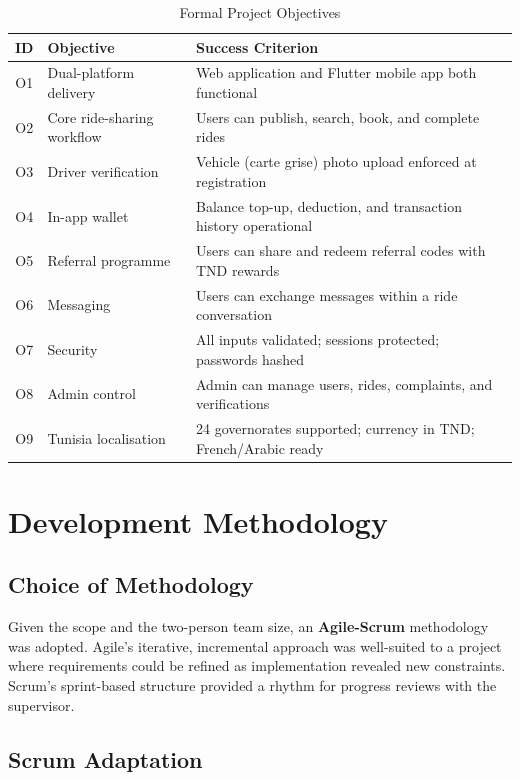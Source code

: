 \documentclass[12pt,a4paper,openright]{report}
\begin{document}
\begin{table}[H]
\centering
\caption{Formal Project Objectives}
\label{tab:objectives}
\begin{tabularx}{\textwidth}{c l X}
\toprule
\textbf{ID} & \textbf{Objective} & \textbf{Success Criterion} \\
\midrule
O1 & Dual-platform delivery & Web application and Flutter mobile app both functional \\
O2 & Core ride-sharing workflow & Users can publish, search, book, and complete rides \\
O3 & Driver verification & Vehicle (carte grise) photo upload enforced at registration \\
O4 & In-app wallet & Balance top-up, deduction, and transaction history operational \\
O5 & Referral programme & Users can share and redeem referral codes with TND rewards \\
O6 & Messaging & Users can exchange messages within a ride conversation \\
O7 & Security & All inputs validated; sessions protected; passwords hashed \\
O8 & Admin control & Admin can manage users, rides, complaints, and verifications \\
O9 & Tunisia localisation & 24 governorates supported; currency in TND; French/Arabic ready \\
\bottomrule
\end{tabularx}
\end{table}

\section{Development Methodology}

\subsection{Choice of Methodology}

Given the scope and the two-person team size, an \textbf{Agile-Scrum} methodology was adopted. Agile's iterative, incremental approach was well-suited to a project where requirements could be refined as implementation revealed new constraints. Scrum's sprint-based structure provided a rhythm for progress reviews with the supervisor.

\subsection{Scrum Adaptation}
\end{document}
